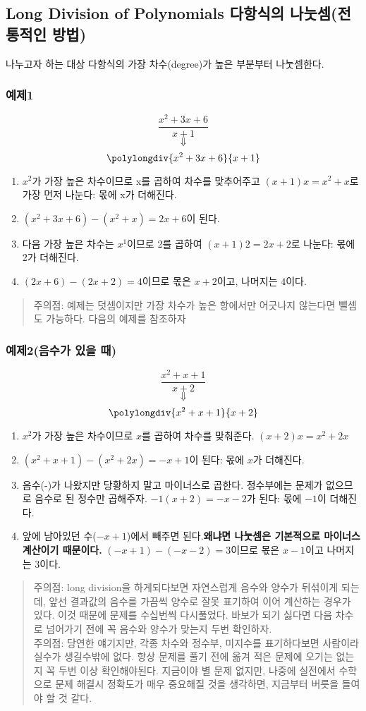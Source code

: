 \documentclass{article}
\begin{document}
\subsection{Long Division of Polynomials 다항식의 나눗셈(전통적인 방법)}
나누고자 하는 대상 다항식의 가장 차수(degree)가 높은 부분부터 나눗셈한다.
\subsubsection{예제1}
$$\frac{x^{2}+3x+6}{x+1}$$
$$\Downarrow$$
$$\polylongdiv{x^{2}+3x+6}{x+1}$$
\begin{enumerate}
\item $x^{2}$가 가장 높은 차수이므로 x를 곱하여 차수를 맞추어주고 $(x+1)x = x^{2}+x$로 가장 먼저 나눈다: 몫에 x가 더해진다.
\item $(x^{2}+3x+6)-(x^{2}+x)=2x+6$이 된다.
\item 다음 가장 높은 차수는 $x^{1}$이므로 2를 곱하여 $(x+1)2 = 2x+2$로 나눈다: 몫에 2가 더해진다.
\item $(2x+6)-(2x+2) = 4$이므로 몫은 $x+2$이고, 나머지는 $4$이다.
\end{enumerate}
\begin{quote}
주의점: 예제는 덧셈이지만 가장 차수가 높은 항에서만 어긋나지 않는다면 뺄셈도 가능하다. 다음의 예제를 참조하자
\end{quote}

\subsubsection{예제2(음수가 있을 때)}
$$\frac{x^{2}+x+1}{x+2}$$
$$\Downarrow$$
$$\polylongdiv{x^{2}+x+1}{x+2}$$
\begin{enumerate}
\item $x^{2}$가 가장 높은 차수이므로 $x$를 곱하여 차수를 맞춰준다. $(x+2)x=x^{2}+2x$
\item $(x^{2}+x+1)-(x^{2}+2x)=-x+1$이 된다: 몫에 $x$가 더해진다.
\item 음수(-)가 나왔지만 당황하지 말고 마이너스로 곱한다. 정수부에는 문제가 없으므로 음수로 된 정수만 곱해주자. $-1(x+2)=-x-2$가 된다: 몫에 $-1$이 더해진다.
\item 앞에 남아있던 수($-x+1$)에서 빼주면 된다.\textbf{왜냐면 나눗셈은 기본적으로 마이너스 계산이기 때문이다.} $(-x+1)-(-x-2)=3$이므로 몫은 $x-1$이고 나머지는 $3$이다.
\end{enumerate}
\begin{quote}
{\color{red} 주의점}: long division을 하게되다보면 자연스럽게 음수와 양수가 뒤섞이게 되는데, 앞선 결과값의 음수를 가끔씩 양수로 잘못 표기하여 이어 계산하는 경우가 있다. 이것 때문에 문제를 수십번씩 다시풀었다. 바보가 되기 싫다면 다음 차수로 넘어가기 전에 꼭 음수와 양수가 맞는지 두번 확인하자.\\
{\color{red} 주의점}: 당연한 얘기지만, 각종 차수와 정수부, 미지수를 표기하다보면 사람이라 실수가 생길수밖에 없다. 항상 문제를 풀기 전에 옮겨 적은 문제에 오기는 없는지 꼭 두번 이상 확인해야된다. 지금이야 별 문제 없지만, 나중에 실전에서 수학으로 문제 해결시 정확도가 매우 중요해질 것을 생각하면, 지금부터 버릇을 들여야 할 것 같다.
\end{quote}
\end{document}
